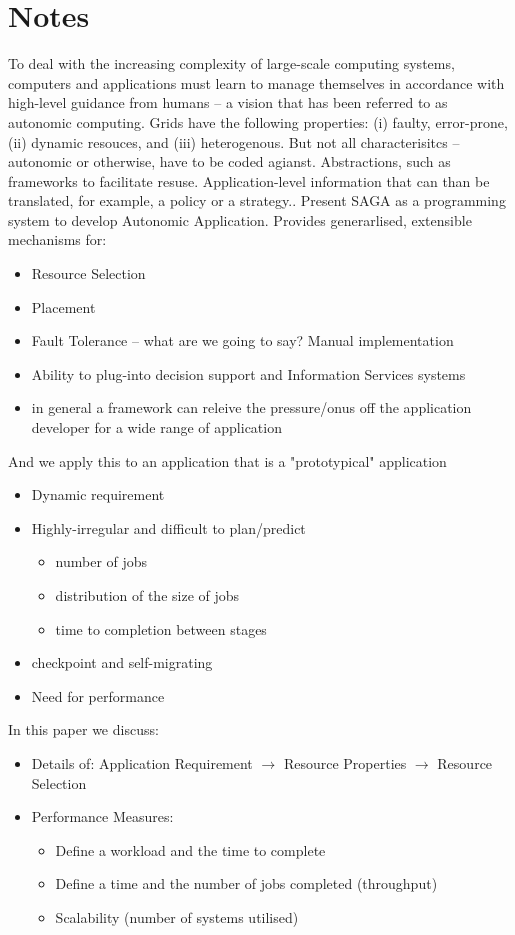 \documentclass[conference,final]{IEEEtran}
\begin{document}
\section*{Notes}

To deal with the increasing complexity of large-scale computing
systems, computers and applications must learn to manage themselves in
accordance with high-level guidance from humans -- a vision that has
been referred to as autonomic computing.  Grids have the following
properties: (i) faulty, error-prone, (ii) dynamic resouces, and (iii)
heterogenous. But not all characterisitcs -- autonomic or otherwise,
have to be coded agianst.  Abstractions, such as frameworks to
facilitate resuse.  Application-level information that can than be
translated, for example, a policy or a strategy.. Present SAGA as a
programming system to develop Autonomic Application.  Provides
generarlised, extensible mechanisms for:
\begin{itemize}
\item  Resource Selection
\item Placement
\item  Fault Tolerance -- what are we going to say? Manual implementation
\item Ability to plug-into decision support and Information Services
  systems
\item in general a framework can releive the pressure/onus off the
  application developer for a wide range of application
\end{itemize}

And we apply this to an application that is a "prototypical"
application

\begin{itemize} 
\item Dynamic requirement
\item Highly-irregular and  difficult to plan/predict
\begin{itemize} 
  \item number of jobs
  \item distribution of the size of jobs
  \item time to completion between stages
\end{itemize} 
\item checkpoint and self-migrating 
\item Need for performance 
\end{itemize} 

In this paper we discuss:
\begin{itemize} 
\item Details of: Application Requirement $\rightarrow$ Resource Properties 
$\rightarrow$ Resource Selection
\item Performance Measures:
  \begin{itemize}
\item Define a workload and the time to complete 
\item Define a time and the number of jobs completed (throughput)
\item Scalability (number of systems utilised)
\end{itemize} 
\end{itemize} 
\end{document}
